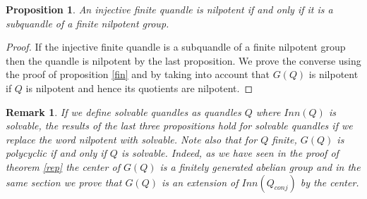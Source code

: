 \documentclass[12pt, reqno]{amsart}
\newtheorem{proposition}[theorem]{Proposition}
\newtheorem{remark}[theorem]{Remark}
\begin{document}
\begin{proposition}
An injective finite quandle is nilpotent if and only if it is a subquandle of a finite nilpotent group.
\end{proposition}
\begin{proof}
If the injective finite quandle is a subquandle of a finite nilpotent group then the quandle is nilpotent by the last proposition. We prove the converse using the proof of proposition \ref{fin} and by taking into account that $G(Q)$ is nilpotent if $Q$ is nilpotent and hence its quotients are nilpotent.
\end{proof}
\begin{remark}
If we define solvable quandles as quandles $Q$ where $Inn(Q)$ is solvable, the results of the last three propositions hold for solvable quandles if we replace the word nilpotent with solvable. Note also that for $Q$ finite, $G(Q)$ is polycyclic if and only if $Q$ is solvable. Indeed, as we have seen in the proof of theorem \ref{rep} the center of $G(Q)$ is a finitely generated abelian group and in the same section we prove that $G(Q)$ is an extension of $Inn(Q_{conj})$ by the center.
\end{remark}
\end{document}
